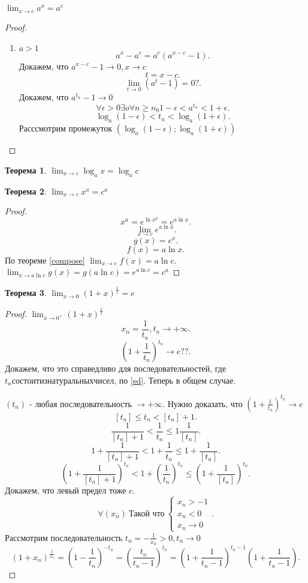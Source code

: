 \documentclass[a4paper]{article}
\newtheorem{theorem}{Теорема}
\begin{document}
\subsection{}
$\lim_{x \to c} a^x = a^c$
\begin{proof}
	\begin{enumerate}
		\item $a>1$
		      \[
			      a^x - a^c = a^c(a^{x - c} - 1)
			      .\]
		      Докажем, что $a^{x - c} - 1 \to 0, x \to c$
		      \[
			      t = x - c
			      .\]
		      \[
			      \lim_{t \to 0} (a^t - 1) = 0 ?
			      .\]
		      Докажем, что $a^{t_n} - 1 \to 0$
		      \[
			      \forall \epsilon > 0 \exists o \forall n \ge n_0 1 - \epsilon < a^{t_n} < 1 + \epsilon
			      .\]
		      \[
			      \log_a{( 1 - \epsilon )} < t_n < \log_a{( 1 + \epsilon )}
			      .\]
		      Расссмотрим промежуток $(\log_a{( 1 - \epsilon )};\log_a{( 1 + \epsilon )})$
	\end{enumerate}
\end{proof}
\begin{theorem}
	$\lim_{x \to c} \log_a{x} = \log_a{c}$
\end{theorem}
\begin{theorem}
	$\lim_{x \to c} x^a = c^a$
\end{theorem}
\begin{proof}
	\[
		x^a = e^{\ln{x^a}}= e^{a\ln{x}}
		.\]
	\[
		\lim_{x \to c} e^{a\ln{x}}
		.\]
	\[
		g(x) = e^x
		.\]
	\[
		f(x) = a\ln{x}
		.\]
	По теореме \ref{compose} $\lim_{x \to c} f(x) = a \ln{c}$. $\lim_{x \to a\ln{c}} g(x) = g(a\ln{c}) = e^{a\ln{c}} = c^a$
\end{proof}
\begin{theorem}
	$\lim_{x \to 0} (1 + x)^{\frac{1}{x}}  = e$
\end{theorem}
\begin{proof}
	$\lim_{x \to 0^+} (1 + x)^{\frac{1}{x}}$
	\[
		x_n = \frac{1}{t_n}, t_n \to +\infty
		.\]
	\[
		(1 + \frac{1}{t_n})^{t_n} \to e ??
		.\]
	Докажем, что это справедливо для последовательностей, где $t_n состоит из натуральных чисел$, по \ref{sd}. Теперь в общем случае.

	$(t_n)$ - любая последовательность  $\to +\infty$. Нужно доказать, что  $(1 + \frac{1}{t_n})^{t_n} \to e$
	\[
		[t_n] \le t_n <  [t_n] +1
		.\]
	\[
		\frac{1}{[t_n] + 1} < \frac{1}{t_n} \le  1\frac{1}{[t_n]}
		.\]
	\[
		1 + \frac{1}{[t_n] + 1} < 1 + \frac{1}{t_n} \le  1 + \frac{1}{[t_n]}
		.\]
	\[
		( 1 + \frac{1}{[t_n] + 1} )^{t_n}< 1  + ( \frac{1}{t_n} )^{t_n} \le  (1 +  \frac{1}{[t_n]} )^{t_n}
		.\]
	Докажем, что левый предел тоже $e$.
	\[
		\forall  (x_n) ~\text{Такой что} ~
		\begin{cases}
			x_n > -1 \\
			x_n < 0  \\
			x_n \to 0
		\end{cases}
		.\]
	Рассмотрим последовательность $t_n = -\frac{1}{x_n} > 0, t_n \to 0$
	\[
		(1 + x_n)^{\frac{1}{x_n}} = (1 - \frac{1}{t_n})^{-t_n} =
		(\frac{t_n}{t_n -1} )^{t_n} = (1 + \frac{1}{t_n -1 })^{t_n - 1} (1 +  \frac{1}{t_n - 1})
		.\]
\end{proof}
\end{document}
